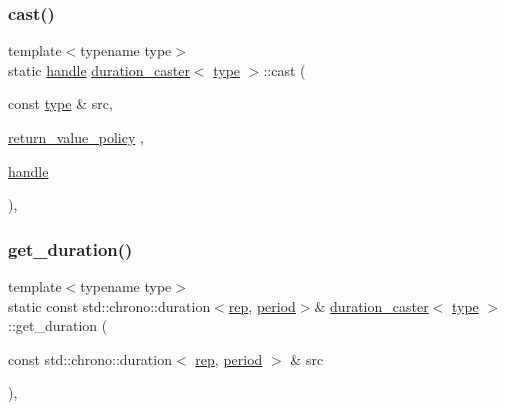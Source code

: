 \subsubsection{\texorpdfstring{cast()}{cast()}}
{\footnotesize\ttfamily template$<$typename type$>$ \\
static \mbox{\hyperlink{classhandle}{handle}} \mbox{\hyperlink{classduration__caster}{duration\+\_\+caster}}$<$ \mbox{\hyperlink{_s_d_l__opengl_8h_ad5ddf6fca7b585646515660e810e0188}{type}} $>$\+::cast (\begin{DoxyParamCaption}\item[{const \mbox{\hyperlink{_s_d_l__opengl_8h_ad5ddf6fca7b585646515660e810e0188}{type}} \&}]{src,  }\item[{\mbox{\hyperlink{detail_2common_8h_adde72ab1fb0dd4b48a5232c349a53841}{return\+\_\+value\+\_\+policy}}}]{,  }\item[{\mbox{\hyperlink{classhandle}{handle}}}]{ }\end{DoxyParamCaption})\hspace{0.3cm}{\ttfamily [inline]}, {\ttfamily [static]}}

\mbox{\label{classduration__caster_ad36a0673aec0ea43023763e9680eb88c}} 
\subsubsection{\texorpdfstring{get\_duration()}{get\_duration()}\hspace{0.1cm}{\footnotesize\ttfamily [1/2]}}
{\footnotesize\ttfamily template$<$typename type$>$ \\
static const std\+::chrono\+::duration$<$\mbox{\hyperlink{classduration__caster_aa56a3f1e4b4c1651fbe0b52f9575e1bd}{rep}}, \mbox{\hyperlink{classduration__caster_ac22f4732d7e0b975d5c5d2e82a7635c4}{period}}$>$\& \mbox{\hyperlink{classduration__caster}{duration\+\_\+caster}}$<$ \mbox{\hyperlink{_s_d_l__opengl_8h_ad5ddf6fca7b585646515660e810e0188}{type}} $>$\+::get\+\_\+duration (\begin{DoxyParamCaption}\item[{const std\+::chrono\+::duration$<$ \mbox{\hyperlink{classduration__caster_aa56a3f1e4b4c1651fbe0b52f9575e1bd}{rep}}, \mbox{\hyperlink{classduration__caster_ac22f4732d7e0b975d5c5d2e82a7635c4}{period}} $>$ \&}]{src }\end{DoxyParamCaption})\hspace{0.3cm}{\ttfamily [inline]}, {\ttfamily [static]}}

